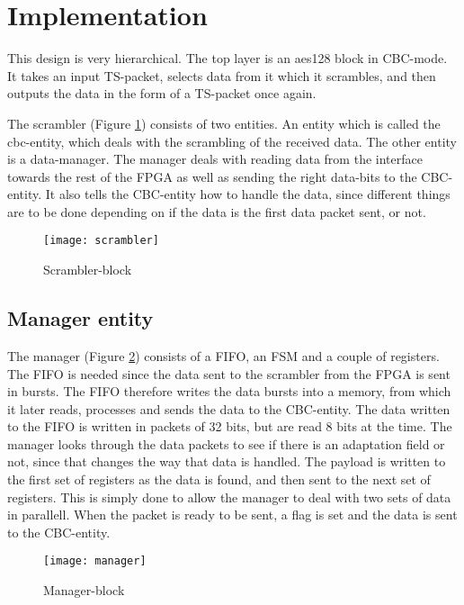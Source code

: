\section{Implementation}
This design is very hierarchical. The top layer is an aes128 block in 
CBC-mode. It takes an input TS-packet, selects data from it which it 
scrambles, and then outputs the data in the form of a TS-packet once 
again.

The scrambler (Figure \ref{block:scrambler}) consists of two entities. 
An entity which is called the cbc-entity, which deals with the 
scrambling of the received data. The other entity is a data-manager. 
The manager deals with reading data from the interface towards the rest 
of the FPGA as well as sending the right data-bits to the CBC-entity. 
It also tells the CBC-entity how to handle the data, since different 
things are to be done depending on if the data is the first data packet 
sent, or not.

\begin{figure}[h!]
  \centering
  \texttt{[image: scrambler]}
  \caption{Scrambler-block}
  \label{block:scrambler}
\end{figure}

\subsection{Manager entity}
The manager (Figure \ref{block:manager}) consists of a FIFO, an FSM and 
a couple of registers. The FIFO is needed since the data sent to the 
scrambler from the FPGA is sent in bursts. The FIFO therefore writes 
the data bursts into a memory, from which it later reads, processes and 
sends the data to the CBC-entity. The data written to the FIFO is 
written in packets of 32 bits, but are read 8 bits at the time. The 
manager looks through the data packets to see if there is an adaptation 
field or not, since that changes the way that data is handled. The 
payload is written to the first set of registers as the data is found, 
and then sent to the next set of registers. This is simply done to 
allow the manager to deal with two sets of data in parallell. When the 
packet is ready to be sent, a flag is set and the data is sent to the 
CBC-entity. 

\begin{figure}[h!]
  \centering
  \texttt{[image: manager]}
  \caption{Manager-block}
  \label{block:manager}
\end{figure}

